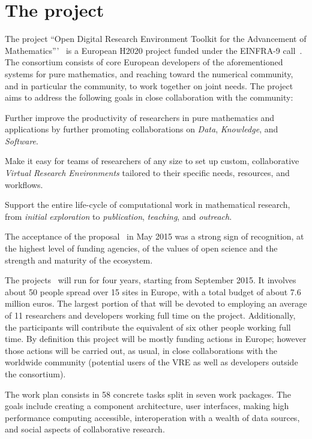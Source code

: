 \section{The \ODK project}\label{sec:odk}
The project ``Open Digital Research Environment Toolkit for the Advancement of
Mathematics'''~\cite{OpenDreamKit:on} is a European H2020 project funded under the
EINFRA-9 call~\cite{EINFRA-9}. 
The \ODK consortium consists of core European developers of the aforementioned systems
for pure mathematics, and reaching toward the numerical community, and in particular the
\Jupyter community, to work together on joint needs.
The project aims to address the following goals in close collaboration with the
community:
\begin{compactenum}
\item Further improve the productivity of researchers in pure mathematics and applications
  by further promoting collaborations on \emph{Data}, \emph{Knowledge}, and
  \emph{Software}.
\item Make it easy for teams of researchers of any size to set up custom, collaborative
  \emph{Virtual Research Environments} tailored to their specific needs, resources, and
  workflows.
\item Support the entire life-cycle of computational work in mathematical research, from
  \emph{initial exploration} to \emph{publication}, \emph{teaching}, and \emph{outreach}.
\end{compactenum}
The acceptance of the proposal~\cite{ODKproposal:on} in May 2015 was a strong sign of
recognition, at the highest level of funding agencies, of the values of open science and
the strength and maturity of the ecosystem.

The \ODK projects~\cite{ODKproposal:on} will run for four years, starting from September
2015. It involves about 50 people spread over 15 sites in Europe, with a total budget of
about 7.6 million euros. The largest portion of that will be devoted to employing an
average of 11 researchers and developers working full time on the project. Additionally,
the participants will contribute the equivalent of six other people working full time.  By
definition this project will be mostly funding actions in Europe; however those actions
will be carried out, as usual, in close collaborations with the worldwide community
(potential users of the VRE as well as developers outside the \ODK consortium).

The \ODK work plan consists in 58 concrete tasks split in seven work packages. The goals include
creating a component architecture, user interfaces, making high performance computing accessible,
interoperation with a wealth of data sources, and social aspects of collaborative research.

